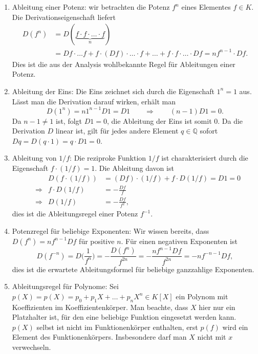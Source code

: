 \begin{enumerate}
%
%
\item
Ableitung einer Potenz: wir betrachten die Potenz $f^n$ eines
Elementes $f\in K$.
Die Derivationseigenschaft liefert
\begin{align*}
D(f^n)
&=
D(\underbrace{f\cdot f\cdot\ldots\cdot f}_{\displaystyle n})
\\
&=
Df\cdot\ldots f
+
f\cdot (Df)\cdot\ldots \cdot f
+
\ldots
+
f\cdot f \cdot\ldots \cdot Df
=
nf^{n-1}\cdot Df.
\end{align*}
Dies ist die aus der Analysis wohlbekannte Regel für Ableitungen einer
Potenz.
%
%
\item
Ableitung der Eins: Die Eins zeichnet sich durch die
Eigenschaft $1^n=1$ aus.
Lässt man die Derivation darauf wirken, erhält man
\[
D(1^n)
=
n1^{n-1}D1
=
D1
\qquad\Rightarrow\qquad
(n-1)D1 = 0.
\]
Da $n-1\ne 1$ ist, folgt $D1=0$, die Ableitung der Eins ist somit $0$.
Da die Derivation $D$ linear ist, gilt für jedes andere Element
$q\in\mathbb{Q}$ sofort $Dq = D(q\cdot 1) = q\cdot D1 = 0$.
%
%
\item
Ableitung von $1/f$: Die reziproke Funktion $1/f$ ist charakterisiert
durch die Eigenschaft $f\cdot (1/f)=1$.
Die Ableitung davon ist
\begin{align*}
&&
D(f\cdot(1/f))
&=
(Df)\cdot (1/f) + f\cdot D(1/f)
=
D1
=
0
\\
&\Rightarrow&
f\cdot D(1/f) &= -\frac{Df}{f}
\\
&\Rightarrow&
D(1/f)
&=
-\frac{Df}{f^2},
\end{align*}
dies ist die Ableitungsregel einer Potenz $f^{-1}$.
%
%
\item
Potenzregel für beliebige Exponenten: Wir wissen bereits,
dass $D(f^n)=nf^{n-1}Df$ für positive $n$.
Für einen negativen Exponenten ist
\[
D(f^{-n})
=
D\biggl(\frac{1}{f^n}\biggr)
=
-
\frac{D(f^n)}{f^{2n}}
=
-\frac{nf^{n-1}Df}{f^{2n}}
=
-
n
f^{-n-1}
Df,
\]
dies ist die erwartete Ableitungsformel für beliebige ganzzahlige 
Exponenten.
%
%
\item
Ableitungsregel für Polynome:
Sei $p(X) = p(X) = p_0 + p_1X + \dots + p_nX^n \in K[X]$ ein Polynom
mit Koeffizienten im Koeffizientenkörper.
Man beachte, dass $X$ hier nur ein Platzhalter ist, für den eine beliebige
Funktion eingesetzt werden kann. 
$p(X)$ selbst ist nicht im Funktionenkörper enthalten, erst $p(f)$ 
wird ein Element des Funktionenkörpers.
Insbesondere darf man $X$ nicht mit $x$ verwechseln.


\end{enumerate}

